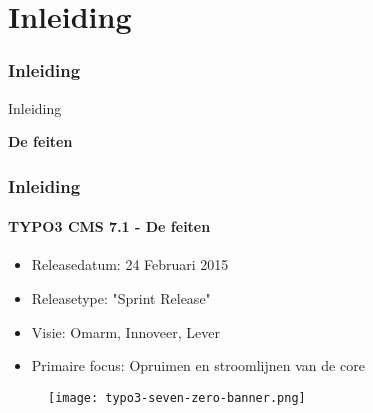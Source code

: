 %

\section{Inleiding}
\begin{frame}[fragile]
	\frametitle{Inleiding}

	\begin{center}\huge{Inleiding}\end{center}
	\begin{center}\huge{\color{typo3darkgrey}\textbf{De feiten}}\end{center}

\end{frame}


\begin{frame}[fragile]
	\frametitle{Inleiding}
	\framesubtitle{TYPO3 CMS 7.1 - De feiten}

	\begin{itemize}
		\item Releasedatum: 24 Februari 2015
		\item Releasetype: "Sprint Release"
		\item Visie: Omarm, Innoveer, Lever
		\item Primaire focus: Opruimen en stroomlijnen van de core
	\end{itemize}

	\begin{figure}
		\texttt{[image: typo3-seven-zero-banner.png]}
	\end{figure}

\end{frame}

